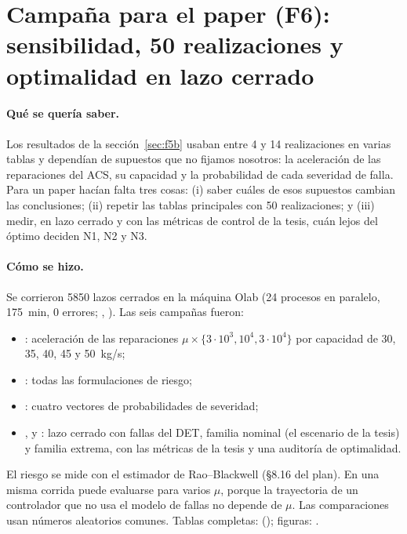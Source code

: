 \section{Campaña para el paper (F6): sensibilidad, 50 realizaciones y optimalidad en lazo cerrado}\label{sec:f6}
\paragraph{Qué se quería saber.} Los resultados de la sección~\ref{sec:f5b} usaban entre 4 y 14
realizaciones en varias tablas y dependían de supuestos que no fijamos nosotros: la aceleración
de las reparaciones del ACS, su capacidad y la probabilidad de cada severidad de falla. Para un
paper hacían falta tres cosas: (i) saber cuáles de esos supuestos cambian las conclusiones;
(ii) repetir las tablas principales con 50 realizaciones; y (iii) medir, en lazo cerrado y con
las métricas de control de la tesis, cuán lejos del óptimo deciden N1, N2 y N3.

\paragraph{Cómo se hizo.} Se corrieron 5850 lazos cerrados en la máquina Olab (24 procesos en
paralelo, 175~min, 0 errores; , ). Las seis
campañas fueron:
\begin{itemize}
  \item {}: aceleración de las reparaciones $\mu\times\{3\cdot10^3,10^4,3\cdot10^4\}$ por capacidad
        de 30, 35, 40, 45 y 50~kg/s;
  \item {}: todas las formulaciones de riesgo;
  \item {}: cuatro vectores de probabilidades de severidad;
  \item {},  y : lazo cerrado con fallas del DET, familia nominal (el escenario
        de la tesis) y familia extrema, con las métricas de la tesis y una auditoría de
        optimalidad.
\end{itemize}
El riesgo se mide con el estimador de Rao--Blackwell (§8.16 del plan). En una misma corrida
puede evaluarse para varios $\mu$, porque la trayectoria de un controlador que no usa el modelo
de fallas no depende de $\mu$. Las comparaciones usan números aleatorios comunes. Tablas
completas:  (); figuras:
.


